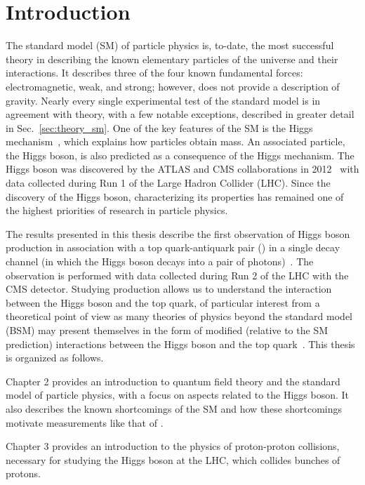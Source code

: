 \chapter{Introduction} \label{chap:introduction}

The standard model (SM) of particle physics is, to-date, the most successful theory in describing the known elementary particles of the universe and their interactions.
It describes three of the four known fundamental forces: electromagnetic, weak, and strong; however, does not provide a description of gravity.
Nearly every single experimental test of the standard model is in agreement with theory, with a few notable exceptions, described in greater detail in Sec.~\ref{sec:theory_sm}.
One of the key features of the SM is the Higgs mechanism~\cite{Higgs:1964pj,Englert:1964et,Guralnik:1964eu}, which explains how particles obtain mass.
An associated particle, the Higgs boson, is also predicted as a consequence of the Higgs mechanism.
The Higgs boson was discovered by the ATLAS and CMS collaborations in 2012~\cite{Aad:2012tfa, Chatrchyan:2012xdj, Chatrchyan:2013lba} with data collected during Run 1 of the Large Hadron Collider (LHC).
Since the discovery of the Higgs boson, characterizing its properties has remained one of the highest priorities of research in particle physics.

The results presented in this thesis describe the first observation of Higgs boson production in association with a top quark-antiquark pair (\ttH) in a single decay channel (in which the Higgs boson decays into a pair of photons)~\cite{tth_observation}.
The observation is performed with data collected during Run 2 of the LHC with the CMS detector.
Studying \ttH production allows us to understand the interaction between the Higgs boson and the top quark, of particular interest from a theoretical point of view as many theories of physics beyond the standard model (BSM) may present themselves in the form of modified (relative to the SM prediction) interactions between the Higgs boson and the top quark~\cite{why_care_top_yukawa}.
This thesis is organized as follows.

Chapter 2 provides an introduction to quantum field theory and the standard model of particle physics, with a focus on aspects related to the Higgs boson. It also describes the known shortcomings of the SM and how these shortcomings motivate measurements like that of \ttH. 

Chapter 3 provides an introduction to the physics of proton-proton collisions, necessary for studying the Higgs boson at the LHC, which collides bunches of protons.

